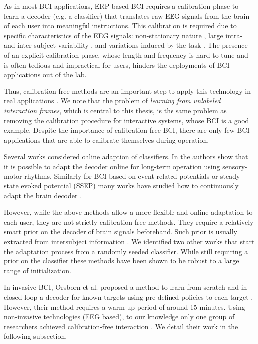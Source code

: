As in most BCI applications, ERP-based BCI requires a calibration phase to learn a decoder (e.g. a classifier) that translates raw EEG signals from the brain of each user into meaningful instructions. This calibration is required due to specific characteristics of the EEG signals: non-stationary nature \cite{vidaurre11}, large intra- and inter-subject variability \cite{Polich1997}, and variations induced by the task \cite{iturrate2013task}. The presence of an explicit calibration phase, whose length and frequency is hard to tune and is often tedious and impractical for users, hinders the deployments of BCI applications out of the lab. 

Thus, calibration free methods are an important step to apply this technology in real applications \cite{millan10}. We note that the problem of \emph{learning from unlabeled interaction frames}, which is central to this thesis, is the same problem as removing the calibration procedure for interactive systems, whose BCI is a good example. Despite the importance of calibration-free BCI, there are only few BCI applications that are able to calibrate themselves during operation.

Several works considered online adaption of classifiers. In \cite{vidaurre2010towards} the authors show that it is possible to adapt the decoder online for long-term operation using sensory-motor rhythms. Similarly for BCI based on
event-related potentials or steady-state evoked potential (SSEP) many works have studied how to continuously adapt the brain decoder \cite{fazli2009subject,lu2009unsupervised,fazli2011l1,congedo2013new,schettini2014self}.

However, while the above methods allow a more flexible and online adaptation to each user, they are not strictly calibration-free methods. They require a relatively smart prior on the decoder of brain signals beforehand. Such prior is usually extracted from intersubject information \cite{fazli2009subject,lu2009unsupervised,vidaurre2010towards}. We identified two other works that start the adaptation process from a randomly seeded classifier. While still requiring a prior on the classifier these methods have been shown to be robust to a large range of initialization.

In invasive BCI, Orsborn et al. proposed a method to learn from scratch and in closed loop a decoder for known targets using pre-defined policies to each target \cite{Orsborn2012}. However, their method requires a warm-up period of around 15 minutes. Using non-invasive technologies (EEG based), to our knowledge only one group of researchers achieved calibration-free interaction \cite{Kindermans2012a,kindermans2014true}. We detail their work in the following subsection.

